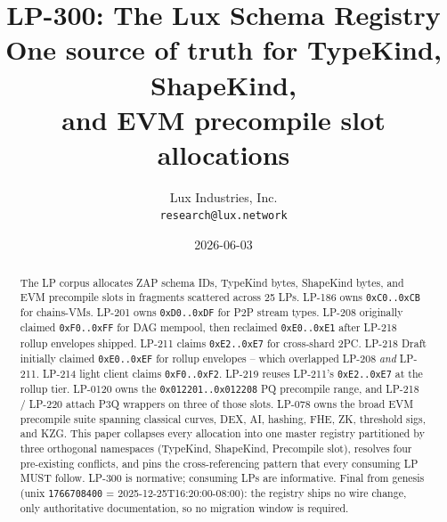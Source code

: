\documentclass[11pt,a4paper]{article}
\title{LP-300: The Lux Schema Registry\\
       \large One source of truth for TypeKind, ShapeKind,\\
       and EVM precompile slot allocations}
\author{Lux Industries, Inc. \\
        \texttt{research@lux.network}}
\date{2026-06-03}
\begin{document}
\luxcoverpage

\begin{abstract}
The LP corpus allocates ZAP schema IDs, TypeKind bytes, ShapeKind
bytes, and EVM precompile slots in fragments scattered across 25
LPs. LP-186 owns \texttt{0xC0..0xCB} for chains-VMs. LP-201 owns
\texttt{0xD0..0xDF} for P2P stream types. LP-208 originally claimed
\texttt{0xF0..0xFF} for DAG mempool, then reclaimed \texttt{0xE0..0xE1}
after LP-218 rollup envelopes shipped. LP-211 claims \texttt{0xE2..0xE7}
for cross-shard 2PC. LP-218 Draft initially claimed \texttt{0xE0..0xEF}
for rollup envelopes -- which overlapped LP-208 \emph{and} LP-211.
LP-214 light client claims \texttt{0xF0..0xF2}. LP-219 reuses LP-211's
\texttt{0xE2..0xE7} at the rollup tier. LP-0120 owns the
\texttt{0x012201..0x012208} PQ precompile range, and LP-218 / LP-220
attach P3Q wrappers on three of those slots. LP-078 owns the broad
EVM precompile suite spanning classical curves, DEX, AI, hashing, FHE,
ZK, threshold sigs, and KZG. This paper collapses every allocation
into one master registry partitioned by three orthogonal namespaces
(TypeKind, ShapeKind, Precompile slot), resolves four pre-existing
conflicts, and pins the cross-referencing pattern that every consuming
LP MUST follow. LP-300 is normative; consuming LPs are informative.
Final from genesis (unix \texttt{1766708400} = 2025-12-25T16:20:00-08:00):
the registry ships no wire change, only authoritative documentation,
so no migration window is required.
\end{abstract}

\tableofcontents
\newpage












\end{document}
